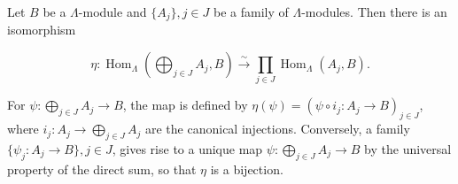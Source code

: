 Let $B$ be a $\Lambda$-module and $\{A_j\}, j \in J$ be a family of $\Lambda$-modules. Then there is an isomorphism

$$\eta : \operatorname{Hom}_{\Lambda}\left( \bigoplus_{j \in J} A_j, B \right) \xrightarrow{\sim} \prod_{j \in J} \operatorname{Hom}_{\Lambda}(A_j, B).$$

For $\psi : \bigoplus_{j \in J} A_j \rightarrow B$, the map is defined by $\eta(\psi) = (\psi \circ i_j : A_j \rightarrow B)_{j \in J}$, where $i_j : A_j \rightarrow \bigoplus_{j \in J} A_j$ are the canonical injections. Conversely, a family $\{\psi_j : A_j \rightarrow B\}, j \in J$, gives rise to a unique map $\psi : \bigoplus_{j \in J} A_j \rightarrow B$ by the universal property of the direct sum, so that $\eta$ is a bijection.
